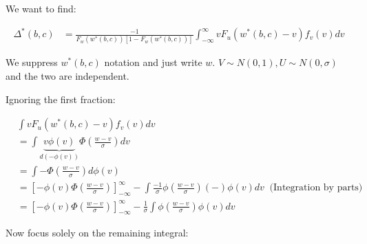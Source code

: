 \documentclass{article}
\begin{document}
    

We want to find:

\begin{align*}
    \Delta^*(b,c) &= \frac{
        -1
    }{
        F_w(w^*(b,c)) [1 - F_w(w^*(b,c))]
    } \int^\infty_{-\infty} vF_u(w^*(b,c) - v) f_v(v) dv
\end{align*}

We suppress $w^*(b,c)$ notation and just write $w$. $V \sim N(0, 1), U \sim N(0, \sigma)$ 
and the two are independent.


Ignoring the first fraction:

\begin{align*}
    &\int vF_u(w^*(b,c) - v) f_v(v) dv \\
    &= 
    \int \underbrace{v \phi(v)}_{d(-\phi(v))} \Phi\left(\frac{w-v}{\sigma}\right) dv \\
    &= \int - \Phi\left(\frac{w-v}{\sigma}\right) d \phi(v) \\
    &= \left[
        -\phi(v) \Phi\left(\frac{w-v}{\sigma}\right) 
    \right]^\infty_{-\infty} - \int \frac{-1}{\sigma}\phi\left(\frac{w - v}{\sigma}\right) (-) \phi(v) dv \ \text{ (Integration by parts)} \\ 
    &= \left[
        -\phi(v) \Phi\left(\frac{w-v}{\sigma}\right) 
    \right]^\infty_{-\infty} -\frac{1}{\sigma} \int \phi\left(\frac{w - v}{\sigma}\right) \phi(v) dv 
\end{align*}


Now focus solely on the remaining integral:
\end{document}
